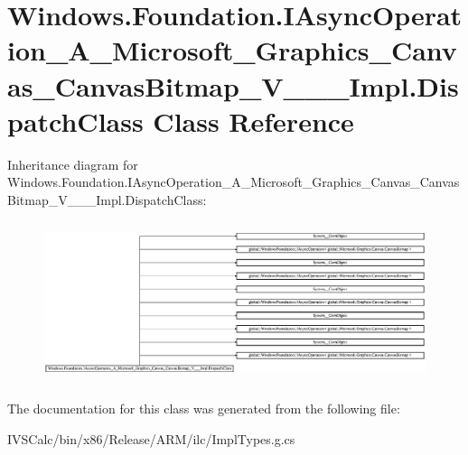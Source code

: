 \hypertarget{class_windows_1_1_foundation_1_1_i_async_operation___a___microsoft___graphics___canvas___canvas_2096a96a9754c4d5166b9ee4d4bd8579}{}\section{Windows.\+Foundation.\+I\+Async\+Operation\+\_\+\+A\+\_\+\+Microsoft\+\_\+\+Graphics\+\_\+\+Canvas\+\_\+\+Canvas\+Bitmap\+\_\+\+V\+\_\+\+\_\+\+\_\+\+Impl.\+Dispatch\+Class Class Reference}
\label{class_windows_1_1_foundation_1_1_i_async_operation___a___microsoft___graphics___canvas___canvas_2096a96a9754c4d5166b9ee4d4bd8579}
Inheritance diagram for Windows.\+Foundation.\+I\+Async\+Operation\+\_\+\+A\+\_\+\+Microsoft\+\_\+\+Graphics\+\_\+\+Canvas\+\_\+\+Canvas\+Bitmap\+\_\+\+V\+\_\+\+\_\+\+\_\+\+Impl.\+Dispatch\+Class\+:\begin{figure}[H]
\begin{center}
\leavevmode
\includegraphics[height=4.738461cm]{class_windows_1_1_foundation_1_1_i_async_operation___a___microsoft___graphics___canvas___canvas_2096a96a9754c4d5166b9ee4d4bd8579}
\end{center}
\end{figure}


The documentation for this class was generated from the following file\+:\begin{DoxyCompactItemize}
\item 
I\+V\+S\+Calc/bin/x86/\+Release/\+A\+R\+M/ilc/Impl\+Types.\+g.\+cs\end{DoxyCompactItemize}
